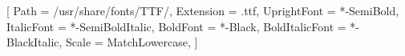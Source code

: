 \setmonofont{JuliaMono}[
    Path            = /usr/share/fonts/TTF/,
    Extension       = .ttf,
    UprightFont     = *-SemiBold,
    ItalicFont      = *-SemiBoldItalic,
    BoldFont        = *-Black,
    BoldItalicFont  = *-BlackItalic,
    Scale           = MatchLowercase,
]




